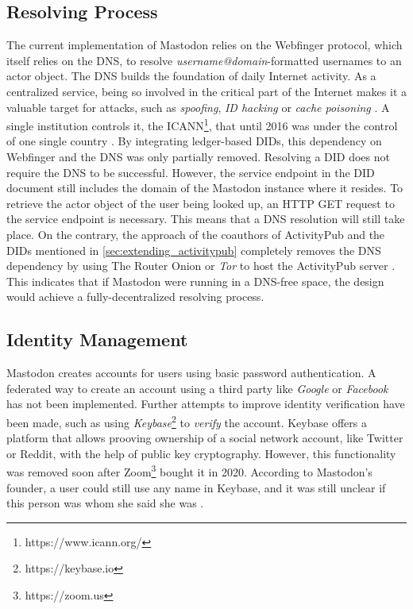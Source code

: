 \subsection{Resolving Process}
The current implementation of Mastodon relies on the Webfinger protocol, which itself relies on the DNS, to resolve \emph{username@domain}-formatted usernames to an actor object. The DNS builds the foundation of daily Internet activity. As a centralized service, being so involved in the critical part of the Internet makes it a valuable target for attacks, such as \emph{spoofing}, \emph{ID hacking} or \emph{cache poisoning} \cite{carli2003security}. A single institution controls it, the ICANN\footnote{https://www.icann.org/}, that until 2016 was under the control of one single country \cite{lee_2016}. 
By integrating ledger-based DIDs, this dependency on Webfinger and the DNS was only partially removed. Resolving a DID does not require the DNS to be successful. However, the service endpoint in the DID document still includes the domain of the Mastodon instance where it resides. To retrieve the actor object of the user being looked up, an HTTP GET request to the service endpoint is necessary. This means that a DNS resolution will still take place. On the contrary, the approach of the coauthors of ActivityPub and the DIDs mentioned in \ref{sec:extending_activitypub} completely removes the DNS dependency by using The Router Onion or \emph{Tor} to host the ActivityPub server \cite{webber_sporny_2017}. This indicates that if Mastodon were running in a DNS-free space, the design would achieve a fully-decentralized resolving process. 
 
\subsection{Identity Management}
Mastodon creates accounts for users using basic password authentication. A federated way to create an account using a third party like \emph{Google} or \emph{Facebook} has not been implemented. Further attempts to improve identity verification have been made, such as using \emph{Keybase}\footnote{https://keybase.io} to \emph{verify} the account. Keybase offers a platform that allows prooving ownership of a social network account, like Twitter or Reddit, with the help of public key cryptography. However, this functionality was removed soon after Zoom\footnote{https://zoom.us} bought it in 2020. According to Mastodon's founder, a user could still use any name in Keybase, and it was still unclear if this person was whom she said she was \cite{rochko_2020}.

